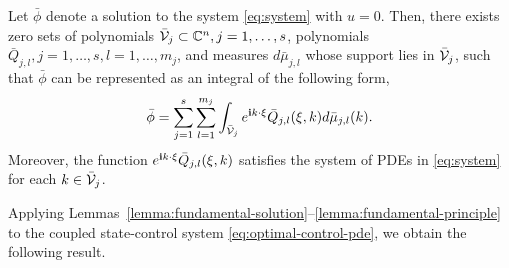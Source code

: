\documentclass[letterpaper, 10 pt, conference]{ieeeconf}  %
\begin{document}
\begin{lemma}\label{lemma:fundamental-principle}
   Let $\bar{\phi}$ denote a solution to the system \eqref{eq:system} with $u=0$. Then, there exists zero sets of polynomials $\bar{\mathcal V}_j\subset \mathbb{C}^n, j=1,\ldots,s$, polynomials $\bar{Q}_{j,l}, j=1,\ldots,s, l=1,\ldots,m_j$, and measures $d\bar{\mu}_{j,l}$ whose support lies in $\bar{\mathcal V}_j$, such that $\bar{\phi}$ can be represented as an integral of the following form,
\begin{equation}\label{eq:ehrenpreis-representation}
   \bar{\phi} = \sum_{j=1}^{s}\sum_{l=1}^{m_j}\int_{\bar{\mathcal V}_j} e^{\mathbf{i} k \cdot \xi} \bar{Q}_{j,l}(\xi,k) d\bar{\mu}_{j,l}(k).
\end{equation}
Moreover, the function $e^{\mathbf{i} k \cdot \xi} \bar{Q}_{j,l}(\xi,k)$ satisfies the system of PDEs in \eqref{eq:system} for each $k\in \bar{\mathcal V}_j$.
\end{lemma}

Applying Lemmas~\ref{lemma:fundamental-solution}--\ref{lemma:fundamental-principle} to the coupled state-control system \eqref{eq:optimal-control-pde}, we obtain the following result.
\end{document}
